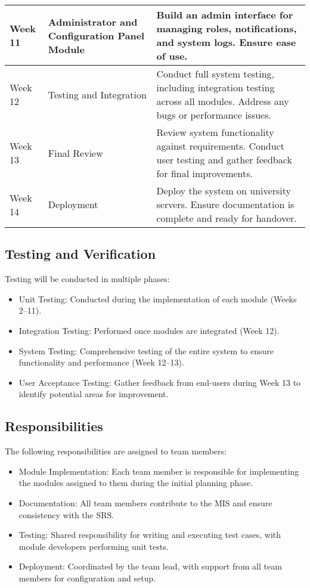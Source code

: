 \documentclass[12pt, titlepage]{article}
\begin{document}
\begin{tabularx}{\textwidth}{|l|l|X|}
\hline
Week 11 & Administrator and Configuration Panel Module & Build an admin interface for managing roles, notifications, and system logs. Ensure ease of use. \\ 
\hline
Week 12 & Testing and Integration & Conduct full system testing, including integration testing across all modules. Address any bugs or performance issues. \\ 
\hline
Week 13 & Final Review & Review system functionality against requirements. Conduct user testing and gather feedback for final improvements. \\ 
\hline
Week 14 & Deployment & Deploy the system on university servers. Ensure documentation is complete and ready for handover. \\ 
\hline
\end{tabularx}

\subsection{Testing and Verification}
Testing will be conducted in multiple phases:
\begin{itemize}
    \item Unit Testing: Conducted during the implementation of each module (Weeks 2–11).
    \item Integration Testing: Performed once modules are integrated (Week 12).
    \item System Testing: Comprehensive testing of the entire system to ensure functionality and performance (Week 12–13).
    \item User Acceptance Testing: Gather feedback from end-users during Week 13 to identify potential areas for improvement.
\end{itemize}

\subsection{Responsibilities}
The following responsibilities are assigned to team members:
\begin{itemize}
    \item Module Implementation: Each team member is responsible for implementing the modules assigned to them during the initial planning phase.
    \item Documentation: All team members contribute to the MIS and ensure consistency with the SRS.
    \item Testing: Shared responsibility for writing and executing test cases, with module developers performing unit tests.
    \item Deployment: Coordinated by the team lead, with support from all team members for configuration and setup.
\end{itemize}
\end{document}
